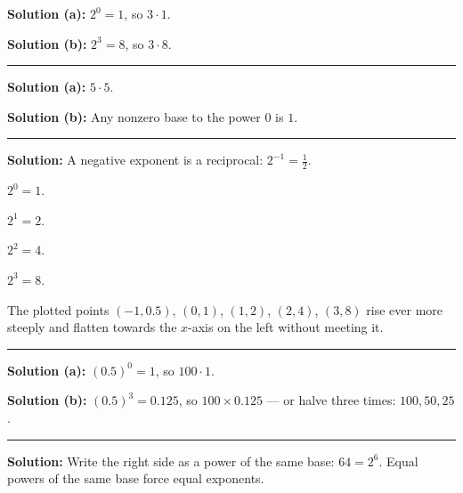 \documentclass[12pt]{article}
\begin{document}



\textbf{Solution (a):} $2^0 = 1$, so $3 \cdot 1$. 

\textbf{Solution (b):} $2^3 = 8$, so $3 \cdot 8$. 

\vspace{0.2cm}\noindent\rule{\linewidth}{0.2pt}


\textbf{Solution (a):} $5 \cdot 5$. 

\textbf{Solution (b):} Any nonzero base to the power $0$ is $1$. 

\vspace{0.2cm}\noindent\rule{\linewidth}{0.2pt}


\textbf{Solution:} A negative exponent is a reciprocal: $2^{-1} = \frac{1}{2}$. 

$2^0 = 1$. 

$2^1 = 2$. 

$2^2 = 4$. 

$2^3 = 8$. 

The plotted points $(-1, 0.5)$, $(0,1)$, $(1,2)$, $(2,4)$, $(3,8)$ rise ever more steeply and flatten towards the $x$-axis on the left without meeting it.

\vspace{0.2cm}\noindent\rule{\linewidth}{0.2pt}


\textbf{Solution (a):} $(0.5)^0 = 1$, so $100 \cdot 1$. 

\textbf{Solution (b):} $(0.5)^3 = 0.125$, so $100 \times 0.125$ --- or halve three times: $100, 50, 25$. 

\vspace{0.2cm}\noindent\rule{\linewidth}{0.2pt}


\textbf{Solution:} Write the right side as a power of the same base: $64 = 2^6$. Equal powers of the same base force equal exponents. 
\end{document}

